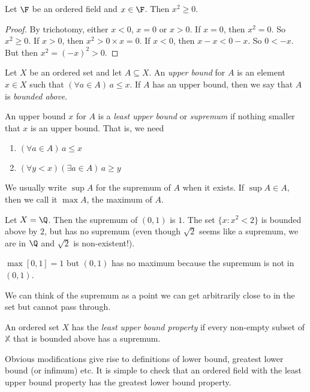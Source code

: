 \documentclass[a4paper]{article}
\begin{document}
\begin{lemma}
  Let $\F$ be an ordered field and $x\in \F$. Then $x^2 \geq 0$.
\end{lemma}

\begin{proof}
  By trichotomy, either $x < 0$, $x = 0$ or $x > 0$. If $x = 0$, then $x^2 = 0$. So $x^2 \geq 0$. If $x > 0$, then $x^2 > 0\times x = 0$. If $x < 0$, then $x - x < 0 - x$. So $0 < -x$. But then $x^2 = (-x)^2 > 0$.
\end{proof}

\begin{defi}
  Let $X$ be an ordered set and let $A\subseteq X$. An \emph{upper bound} for $A$ is an element $x\in X$ such that $(\forall a\in A)\,a \leq x$. If $A$ has an upper bound, then we say that $A$ is \emph{bounded above}.

  An upper bound $x$ for $A$ is a \emph{least upper bound} or \emph{supremum} if nothing smaller that $x$ is an upper bound. That is, we need
  \begin{enumerate}
    \item $(\forall a\in A)\,a \leq x$
    \item $(\forall y < x)(\exists a\in A)\,a \geq y$
  \end{enumerate}

  We usually write $\sup A$ for the supremum of $A$ when it exists. If $\sup A\in A$, then we call it $\max A$, the maximum of $A$.
\end{defi}

\begin{eg}
  Let $X = \Q$. Then the supremum of $(0, 1)$ is $1$. The set $\{x: x^2 < 2\}$ is bounded above by $2$, but has no supremum (even though $\sqrt{2}$ seems like a supremum, we are in $\Q$ and $\sqrt{2}$ is non-existent!).

  $\max [0, 1] = 1$ but $(0, 1)$ has no maximum because the supremum is not in $(0, 1)$.
\end{eg}

We can think of the supremum as a point we can get arbitrarily close to in the set but cannot pass through.

\begin{defi}
  An ordered set $X$ has the \emph{least upper bound property} if every non-empty subset of $\mathbb{X}$ that is bounded above has a supremum.
\end{defi}

Obvious modifications give rise to definitions of lower bound, greatest lower bound (or infimum) etc. It is simple to check that an ordered field with the least upper bound property has the greatest lower bound property.
\end{document}
